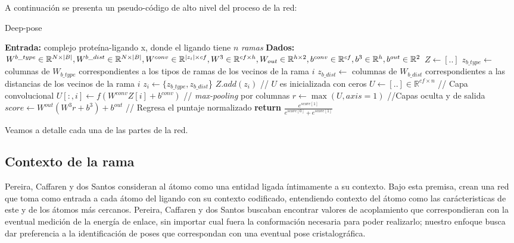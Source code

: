 A continuación se presenta un pseudo-código de alto nivel del proceso
de la red:
\newpage
\begin{algorithm}[H]
  \caption{Deep-pose}
  \begin{algorithmic}[1]
    \State \textbf{Entrada:} complejo proteína-ligando x,
    donde el ligando tiene $n$ \textit{ramas}
    \State \textbf{Dados:}\newline
                           $W^{b\_type} \in \mathbb{R}^{N\times |B|}, W^{b\_dist}
                           \in \mathbb{R}^{N\times |B|},\newline
                           W^{conv} \in \mathbb{R}^{|z_i| \times cf}, W^3 \in
                           \mathbb{R}^{cf \times h},\newline
                           W_{out} \in \mathbb{R}^{h \times 2},\newline
                           b^{conv} \in \mathbb{R}^{cf}, b^{3} \in
                           \mathbb{R}^{h},\newline
                           b^{out} \in \mathbb{R}^{2}$
    \State $Z \gets [..]$
      \State $z_{b\_type} \gets$ columnas de $W_{b\_type}$
      correspondientes a los tipos de ramas de los vecinos de la
      rama $i$
      \State $z_{b\_dist} \gets$  columnas de $W_{b\_dist}$
      correspondientes a las distancias de los vecinos de la rama $i$
      \State $z_i \gets \{z_{b\_type}, z_{b\_dist}$\}
      \State $Z.add(z_i)$
    \EndFor
    \State // $U$ es inicializada con ceros
    \State $U \gets [..] \in \mathbb{R}^{cf \times n}$
    \State // Capa convolucional
      \State $U[:,i]\gets f(W^{conv}Z[i] + b^{conv})$
    \EndFor
    \State // \textit{max-pooling} por columnas
    \State $r\gets \max(U, axis=1)$
    \State //Capas oculta y de salida
    \State $score\gets W^{out}(W^3r + b^3) + b^{out}$
    \State // Regresa el puntaje normalizado
    \State \textbf{return} $\frac{e^{score[1]}}{e^{score[0]}+e^{score[1]}}$
  \end{algorithmic}
\end{algorithm}
Veamos a detalle cada una de las partes de la red.

\subsection{Contexto de la rama}
Pereira, Caffaren y dos Santos \cite{dossantos} consideran al átomo
como una entidad ligada íntimamente a su contexto. Bajo esta premisa,
crean una red que toma como entrada a cada átomo del ligando con su
contexto codificado, entendiendo contexto del átomo como las
carácteristicas de este y de los átomos más cercanos.  Pereira,
Caffaren y dos Santos buscaban encontrar valores de acoplamiento que
correspondieran con la eventual medición de la energía de enlace, sin
importar cual fuera la conformación necesaria para poder realizarlo;
nuestro enfoque busca dar preferencia a la identificación de poses
que correspondan con una eventual pose cristalográfica.

